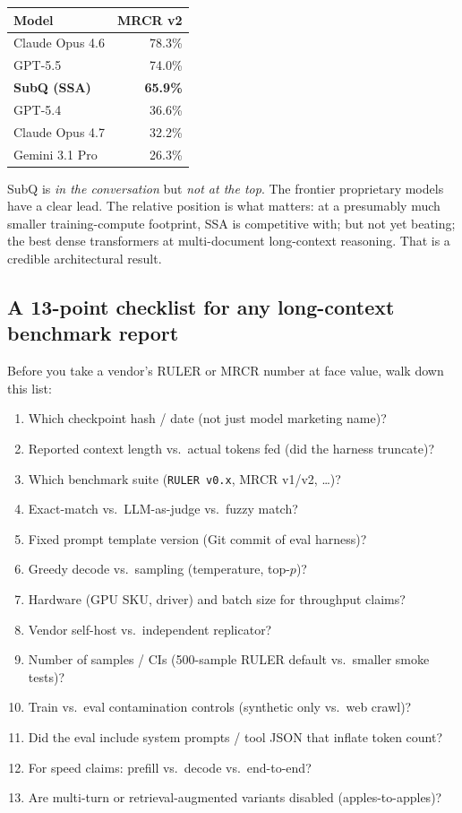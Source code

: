 \begin{center}
\begin{tabular}{lr}
\toprule
Model & MRCR v2 \\
\midrule
Claude Opus 4.6     & 78.3\% \\
GPT-5.5             & 74.0\% \\
\textbf{SubQ (SSA)} & \textbf{65.9\%} \\
GPT-5.4             & 36.6\% \\
Claude Opus 4.7     & 32.2\% \\
Gemini 3.1 Pro      & 26.3\% \\
\bottomrule
\end{tabular}
\end{center}

SubQ is \emph{in the conversation} but \emph{not at the top}. The frontier
proprietary models have a clear lead. The relative position is what
matters: at a presumably much smaller training-compute footprint, SSA
is competitive with; but not yet beating; the best dense transformers
at multi-document long-context reasoning. That is a credible architectural
result.

\subsection{A 13-point checklist for any long-context benchmark report}

Before you take a vendor's RULER or MRCR number at face value, walk down
this list:

\begin{enumerate}
\item Which checkpoint hash / date (not just model marketing name)?
\item Reported context length vs.\ actual tokens fed (did the harness truncate)?
\item Which benchmark suite (\texttt{RULER v0.x}, MRCR v1/v2, \ldots)?
\item Exact-match vs.\ LLM-as-judge vs.\ fuzzy match?
\item Fixed prompt template version (Git commit of eval harness)?
\item Greedy decode vs.\ sampling (temperature, top-\(p\))?
\item Hardware (GPU SKU, driver) and batch size for throughput claims?
\item Vendor self-host vs.\ independent replicator?
\item Number of samples / CIs (500-sample RULER default vs.\ smaller smoke tests)?
\item Train vs.\ eval contamination controls (synthetic only vs.\ web crawl)?
\item Did the eval include system prompts / tool JSON that inflate token count?
\item For speed claims: prefill vs.\ decode vs.\ end-to-end?
\item Are multi-turn or retrieval-augmented variants disabled (apples-to-apples)?
\end{enumerate}

